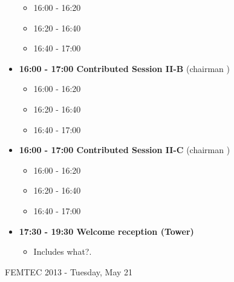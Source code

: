 \documentclass[10pt, A4]{article}
\begin{document}
\begin{itemize}
  \begin{itemize}
    \item 16:00 - 16:20 
    \item 16:20 - 16:40 
    \item 16:40 - 17:00 
  \end{itemize}
  \item {\bf 16:00 - 17:00 Contributed Session II-B} (chairman ) 
  \begin{itemize}
    \item 16:00 - 16:20 
    \item 16:20 - 16:40 
    \item 16:40 - 17:00 
  \end{itemize}
    \item {\bf 16:00 - 17:00 Contributed Session II-C} (chairman ) 
  \begin{itemize}
    \item 16:00 - 16:20 
    \item 16:20 - 16:40 
    \item 16:40 - 17:00 
  \end{itemize}    
  \item {\bf 17:30 - 19:30 Welcome reception (Tower)} 
  \begin{itemize}
     \item Includes what?.
  \end{itemize}
\end{itemize}

\newpage

\centerline{\huge FEMTEC 2013 - Tuesday, May 21}
\vspace{4mm}
\end{document}
